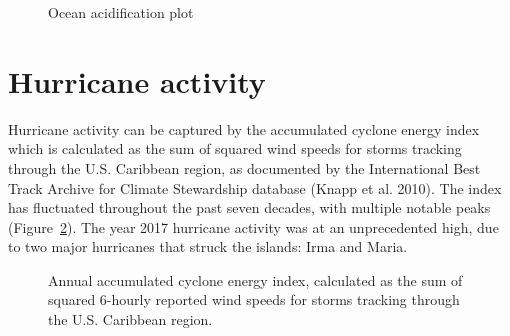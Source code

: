 \documentclass[
  letterpaper,
  oneside,
  open=any]{scrbook}
\begin{document}
\begin{figure}


\caption{\label{fig-OA}Ocean acidification plot}

\end{figure}%

\section{Hurricane activity}\label{hurricane-activity}

Hurricane activity can be captured by the accumulated cyclone energy
index which is calculated as the sum of squared wind speeds for storms
tracking through the U.S. Caribbean region, as documented by the
International Best Track Archive for Climate Stewardship database (Knapp
et al. 2010). The index has fluctuated throughout the past seven
decades, with multiple notable peaks (Figure~\ref{fig-ACE}). The year
2017 hurricane activity was at an unprecedented high, due to two major
hurricanes that struck the islands: Irma and Maria.

\begin{figure}


\caption{\label{fig-ACE}Annual accumulated cyclone energy index,
calculated as the sum of squared 6-hourly reported wind speeds for
storms tracking through the U.S. Caribbean region.}

\end{figure}%
\end{document}
